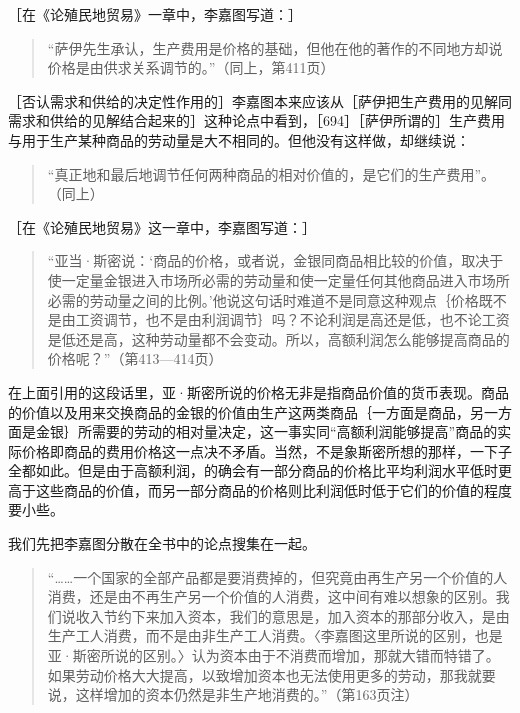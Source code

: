 
［在《论殖民地贸易》一章中，李嘉图写道：］

\begin{quote}{“萨伊先生承认，生产费用是价格的基础，但他在他的著作的不同地方却说价格是由供求关系调节的。”（同上，第411页）}\end{quote}

［否认需求和供给的决定性作用的］李嘉图本来应该从［萨伊把生产费用的见解同需求和供给的见解结合起来的］这种论点中看到，［694］［萨伊所谓的］生产费用与用于生产某种商品的劳动量是大不相同的。但他没有这样做，却继续说：

\begin{quote}{“真正地和最后地调节任何两种商品的相对价值的，是它们的生产费用”。（同上）}\end{quote}

［在《论殖民地贸易》这一章中，李嘉图写道：］

\begin{quote}{“亚当·斯密说：‘商品的价格，或者说，金银同商品相比较的价值，取决于使一定量金银进入市场所必需的劳动量和使一定量任何其他商品进入市场所必需的劳动量之间的比例。’他说这句话时难道不是同意这种观点｛价格既不是由工资调节，也不是由利润调节｝吗？不论利润是高还是低，也不论工资是低还是高，这种劳动量都不会变动。所以，高额利润怎么能够提高商品的价格呢？”（第413—414页）}\end{quote}

在上面引用的这段话里，亚·斯密所说的价格无非是指商品价值的货币表现。商品的价值以及用来交换商品的金银的价值由生产这两类商品｛一方面是商品，另一方面是金银｝所需要的劳动的相对量决定，这一事实同“高额利润能够提高”商品的实际价格即商品的费用价格这一点决不矛盾。当然，不是象斯密所想的那样，一下子全都如此。但是由于高额利润，的确会有一部分商品的价格比平均利润水平低时更高于这些商品的价值，而另一部分商品的价格则比利润低时低于它们的价值的程度要小些。



我们先把李嘉图分散在全书中的论点搜集在一起。

\begin{quote}{“……一个国家的全部产品都是要消费掉的，但究竟由再生产另一个价值的人消费，还是由不再生产另一个价值的人消费，这中间有难以想象的区别。我们说收入节约下来加入资本，我们的意思是，加入资本的那部分收入，是由生产工人消费，而不是由非生产工人消费。〈李嘉图这里所说的区别，也是亚·斯密所说的区别。〉认为资本由于不消费而增加，那就大错而特错了。如果劳动价格大大提高，以致增加资本也无法使用更多的劳动，那我就要说，这样增加的资本仍然是非生产地消费的。”（第163页注）}\end{quote}


